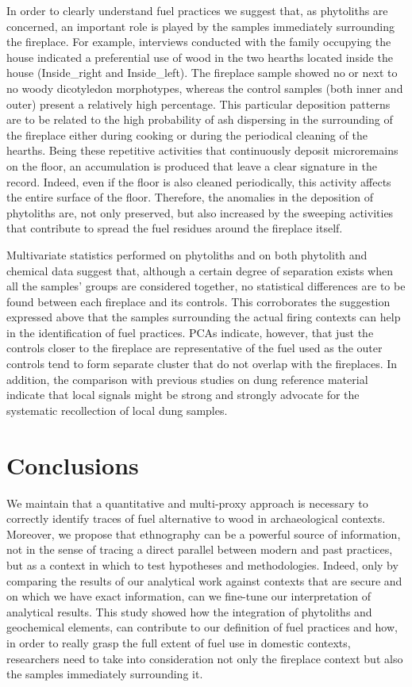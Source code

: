 \documentclass[authoryear,preprint,review,12pt]{elsarticle}
\begin{document}
In order to clearly understand fuel practices we suggest that, as phytoliths are concerned, an important role is played by the samples immediately surrounding the fireplace. For example, interviews conducted with the family occupying the house indicated a preferential use of wood in the two hearths located inside the house (Inside\_right and Inside\_left). The fireplace sample showed no or next to no woody dicotyledon morphotypes, whereas the control samples (both inner and outer) present a relatively high percentage. This particular deposition patterns are to be related to the high probability of ash dispersing in the surrounding of the fireplace either during cooking or during the periodical cleaning of the hearths. Being these repetitive activities that continuously deposit microremains on the floor, an accumulation is produced that leave a clear signature in the record. Indeed, even if the floor is also cleaned periodically, this activity affects the entire surface of the floor. Therefore, the anomalies in the deposition of phytoliths are, not only preserved, but also increased by the sweeping activities that contribute to spread the fuel residues around the fireplace itself.\par
Multivariate statistics performed on phytoliths and on both phytolith and chemical data suggest that, although a certain degree of separation exists when all the samples' groups are considered together, no statistical differences are to be found between each fireplace and its controls. This corroborates the suggestion expressed above that the samples surrounding the actual firing contexts can help in the identification of fuel practices. PCAs indicate, however, that just the controls closer to the fireplace are representative of the fuel used as the outer controls tend to form separate cluster that do not overlap with the fireplaces. In addition, the comparison with previous studies on dung reference material indicate that local signals might be strong and strongly advocate for the systematic recollection of local dung samples.


\section{Conclusions}
\label{sec:5}
We maintain that a quantitative and multi-proxy approach is necessary to correctly identify traces of fuel alternative to wood in archaeological contexts. Moreover, we propose that ethnography can be a powerful source of information, not in the sense of tracing a direct parallel between modern and past practices, but as a context in which to test hypotheses and methodologies. Indeed, only by comparing the results of our analytical work against contexts that are secure and on which we have exact information, can we fine-tune our interpretation of analytical results. This study showed how the integration of phytoliths and geochemical elements, can contribute to our definition of fuel practices and how, in order to really grasp the full extent of fuel use in domestic contexts, researchers need to take into consideration not only the fireplace context but also the samples immediately surrounding it.
\end{document}

